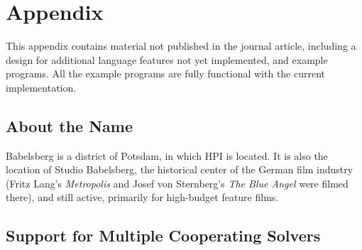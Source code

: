\lstset{basicstyle=\footnotesize\ttfamily}
\section{Appendix}

This appendix contains material not published in the journal article,
including a design for additional language features not yet
implemented, and example programs.  All the example programs are fully
functional with the current implementation.

\subsection{About the Name}


Babelsberg is a district of Potsdam, in which HPI is located.  It is
also the location of Studio Babelsberg, the historical center of the
German film industry (Fritz Lang's \emph{Metropolis} and Josef von
Sternberg's \emph{The Blue Angel} were filmed there), and still
active, primarily for high-budget feature films.


\subsection{Support for Multiple Cooperating Solvers}
\label{sec:cooperating-solvers}

